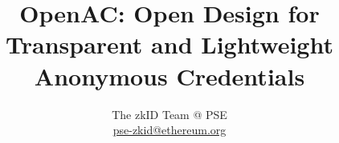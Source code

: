 \documentclass{article}
\author{The zkID Team @ PSE \\\href{mailto:pse-zkid@ethereum.org}{pse-zkid@ethereum.org}}
\affil{Ethereum Foundation}
\title{OpenAC: Open Design for Transparent and Lightweight Anonymous Credentials}
\begin{document}
\maketitle




\begin{abstract}

\end{abstract}


% 
\end{document}
